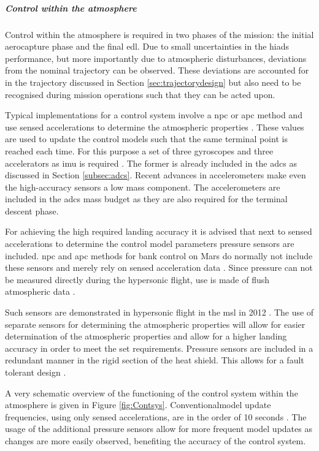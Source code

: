 \subparagraph{Control within the atmosphere}
Control within the atmosphere is required in two phases of the mission: the initial aerocapture phase and the final \gls{edl}. Due to small uncertainties in the \glspl{hiad} performance, but more importantly due to atmospheric disturbances, deviations from the nominal trajectory can be observed. These deviations are accounted for in the trajectory discussed in Section \ref{sec:trajectorydesign} but also need to be recognised during mission operations such that they can be acted upon. 

Typical implementations for a control system involve a \gls{npc} or \gls{apc} method and use sensed accelerations to determine the atmospheric properties \cite{Davis2010}. These values are used to update the control models such that the same terminal point is reached each time. For this purpose a set of three gyroscopes and three accelerators as \gls{imu} is required \cite{Dutta2013}. The former is already included in the \gls{adcs} as discussed in Section \ref{subsec:adcs}. Recent advances in accelerometers make even the high-accuracy sensors a low mass component. The accelerometers are included in the \gls{adcs} mass budget as they are also required for the terminal descent phase. 

For achieving the high required landing accuracy it is advised that next to sensed accelerations to determine the control model parameters pressure sensors are included.  \gls{npc} and \gls{apc} methods for bank control on Mars do normally not include these sensors and merely rely on sensed acceleration data \cite{Lu2007, Davis2010}. Since pressure can not be measured directly during the hypersonic flight, use is made of flush atmospheric data \cite{Dutta2013}. 
 
Such sensors are demonstrated in hypersonic flight in the \gls{msl} in 2012 \cite{Dutta2013}. The use of separate sensors for determining the atmospheric properties will allow for easier determination of the atmospheric properties and allow for a higher landing accuracy in order to meet the set requirements.
Pressure sensors are included in a redundant manner in the rigid section of the heat shield. This allows for a fault tolerant design \cite{Whitmore1995}. 

A very schematic overview of the functioning of the control system within the atmosphere is given in Figure \ref{fig:Contsys}. Conventionalmodel update frequencies, using only sensed accelerations, are in the order of 10 seconds \cite{Davis2010}. The usage of the additional pressure sensors allow for more frequent model updates as changes are more easily observed, benefiting the accuracy of the control system.

